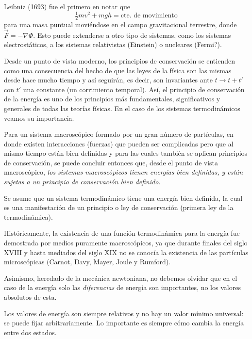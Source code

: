 Leibniz (1693) fue el primero en notar que
\begin{equation*}
  \tfrac{1}{2}mv^{2}+mgh=\text{cte. de movimiento}
\end{equation*}
para una masa puntual moviéndose en el campo gravitacional terrestre, donde $\vec{F}=-\nabla\Phi$.
Esto puede extenderse a otro tipo de sistemas, como los sistemas electrostáticos, a los sistemas
relativistas (Einstein) o nucleares (Fermi?).

Desde un punto de vista moderno, los principios de conservación se entienden como una consecuencia
del hecho de que las leyes de la física son las mismas desde hace mucho tiempo y así seguirán, es
decir, son invariantes ante $t\to t+t'$ con $t'$ una constante (un corrimiento temporal). Así,
el principio de conservación de la energía es uno de los principios más fundamentales,
significativos y generales de todas las teorías físicas. En el caso de los sistemas
termodinámicos veamos su importancia.

Para un sistema macroscópico formado por un gran número de partículas, en donde existen
interacciones (fuerzas) que pueden ser complicadas pero que al mismo tiempo están bien definidas y
para las cuales también se aplican principios de conservación, se puede concluir entonces que,
desde el punto de vista macroscópico, \emph{los sistemas macroscópicos tienen energías bien
definidas, y están sujetas a un principio de conservación bien definido}.

\begin{postulado}
  Se asume que un sistema termodinámico tiene una energía bien definida, la cual es una
  manifestación de un principio o ley de conservación (primera ley de la termodinámica).
\end{postulado}

Históricamente, la existencia de una función termodinámica para la energía fue demostrada por
medios puramente macroscópicos, ya que durante finales del siglo XVIII y hasta mediados del siglo
XIX no se conocía la existencia de las partículas microscópicas (Carnot, Davy, Mayer, Joule y
Rumford).

Asimismo, heredado de la mecánica newtoniana, no debemos olvidar que en el caso de la energía solo
las \emph{diferencias} de energía son importantes, no los valores absolutos de esta.
\begin{observacion}
  Los valores de energía son siempre relativos y no hay un valor mínimo universal: se puede fijar
  arbitrariamente. Lo importante es siempre cómo cambia la energía entre dos estados.
\end{observacion}

